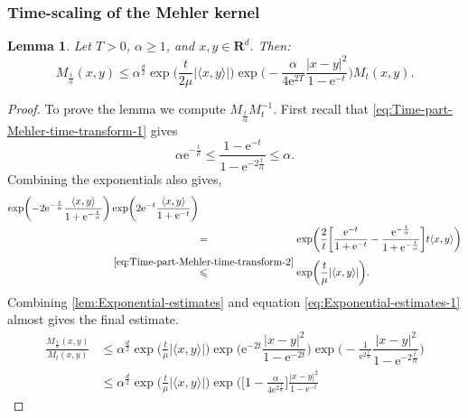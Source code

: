 \documentclass[a4paper,oneside,10pt]{amsproc}
\newtheorem{lemma}{Lemma}
\theoremstyle{remark}
\newcommand{\la}{\langle}
\newcommand{\ra}{\rangle}
\renewcommand{\leq}{\leqslant}
\renewcommand{\leq}{\leqslant}
\renewcommand{\geq}{\geqslant}
\newcommand{\R}{\mathbf R}
\newcommand{\e}{\mathrm{e}} %
\renewcommand{\leq}{\leqslant}%
\renewcommand{\geq}{\geqslant}%
\begin{document}
\subsubsection{Time-scaling of the Mehler kernel}
\begin{lemma}\label{lem:Kernel-estimates-1}
  Let $T > 0$, $\alpha \geq 1$, and $x, y \in \R^d$. Then:
  \begin{equation}
    \label{eq:Kernel-lemma-1-estimate} 
    M_{\frac{t}{\alpha}}(x, y) \leq \alpha^{\frac{d}2}
    \exp\biggl (\frac{t}{2\mu} |\la x, y \ra| \biggr)
   \exp\biggl(-\frac{\alpha}{4\e^{2T}} \frac{|x - y|^2}{1 - \e^{-t}}
   \biggr) M_{t}(x, y).
  \end{equation}
\end{lemma}
\begin{proof}
  To prove the lemma we compute $M_{\frac{t}{\alpha}} M_t^{-1}$.
  First recall that \eqref{eq:Time-part-Mehler-time-transform-1} gives
  \begin{equation*}
    \alpha \e^{-\frac{t}\mu} \leq \frac{1 - \e^{-t}}{1 -
      \e^{-2\frac{t}{\alpha}}} \leq \alpha.
  \end{equation*}
  Combining the exponentials also gives,
  \begin{align*}
    \exp \biggl (-2\e^{-\frac{t}\alpha} \frac{\la x, y \ra}{1 + \e^{-\frac{t}{\alpha}}}
    \biggr ) &\exp \biggl (2 \e^{-t} \frac{\la x, y \ra}{1 + \e^{-t}}
    \biggr )\\
    &\stackrel{\phantom{\eqref{eq:Time-part-Mehler-time-transform-2}}}{=}
    \exp\biggl (\frac2{t}\biggl[\frac{\e^{-t}}{1 + \e^{-t}} - \frac{\e^{-\frac{t}\alpha}}{1 +
      \e^{-\frac{t}{\alpha}}} \biggr] t \la x, y \ra \biggr)\\
    &\stackrel{\eqref{eq:Time-part-Mehler-time-transform-2}}{\leq}
    \exp\biggl (\frac{t}{\mu} |\la x, y \ra| \biggr).
  \end{align*}
  Combining \autoref{lem:Exponential-estimates} and equation
  \eqref{eq:Exponential-estimates-1} almost gives the final estimate.
  \begin{align*}
    \frac{M_{\frac{t}{\alpha}}(x, y)}{M_{t}(x, y)} &\leq
    \alpha^{\frac{d}2} \exp\biggl (\frac{t}{\mu} |\la x, y \ra| \biggr)
    \exp\biggl(\e^{-2t} \dfrac{|x - y|^2}{1 - \e^{-2t}} \biggr)
    \exp\biggl(-\frac1{\e^{2\frac{t}{\alpha}}} \dfrac{|x - y|^2}{1 -
      \e^{-2\frac{t}{\alpha}}}  \biggr)\\ 
    &\leq \alpha^{\frac{d}2} \exp\biggl (\frac{t}{\mu} |\la x, y \ra|
    \biggr) \exp \biggl (\biggl[1 -\frac{\alpha}{4\e^{2
        \frac{t}{\kappa}}} \biggr]  \frac{|x - y|^2}{1 - \e^{-t}}

\end{align*}
\end{proof}
\end{document}
